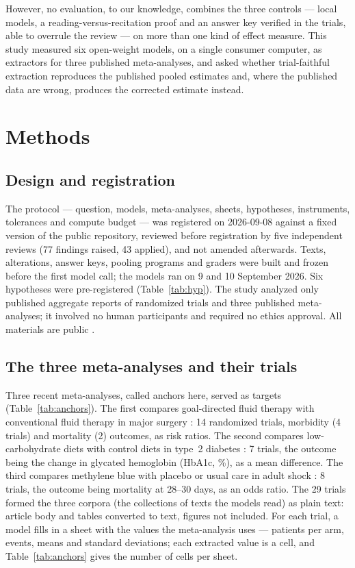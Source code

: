 \documentclass[11pt]{article}
\begin{document}
However, no evaluation, to our knowledge, combines the three controls --- local models, a reading-versus-recitation proof and an answer key verified in the trials, able to overrule the review --- on more than one kind of effect measure. This study measured six open-weight models, on a single consumer computer, as extractors for three published meta-analyses, and asked whether trial-faithful extraction reproduces the published pooled estimates and, where the published data are wrong, produces the corrected estimate instead.

\section{Methods}

\subsection{Design and registration}
The protocol --- question, models, meta-analyses, sheets, hypotheses, instruments, tolerances and compute budget --- was registered on 2026-09-08 against a fixed version of the public repository, reviewed before registration by five independent reviews (77 findings raised, 43 applied), and not amended afterwards. Texts, alterations, answer keys, pooling programs and graders were built and frozen before the first model call; the models ran on 9 and 10 September 2026. Six hypotheses were pre-registered (Table~\ref{tab:hyp}). The study analyzed only published aggregate reports of randomized trials and three published meta-analyses; it involved no human participants and required no ethics approval. All materials are public \citep{barra2026extrai}.

\subsection{The three meta-analyses and their trials}
Three recent meta-analyses, called anchors here, served as targets (Table~\ref{tab:anchors}). The first compares goal-directed fluid therapy with conventional fluid therapy in major surgery \citep{ashraf2026gdft}: 14 randomized trials, morbidity (4 trials) and mortality (2) outcomes, as risk ratios. The second compares low-carbohydrate diets with control diets in type~2 diabetes \citep{khraise2026lowcarb}: 7 trials, the outcome being the change in glycated hemoglobin (HbA1c, \%), as a mean difference. The third compares methylene blue with placebo or usual care in adult shock \citep{rodriguezlima2026methylene}: 8 trials, the outcome being mortality at 28--30 days, as an odds ratio. The 29 trials formed the three corpora (the collections of texts the models read) as plain text: article body and tables converted to text, figures not included. For each trial, a model fills in a sheet with the values the meta-analysis uses --- patients per arm, events, means and standard deviations; each extracted value is a cell, and Table~\ref{tab:anchors} gives the number of cells per sheet.
\end{document}
